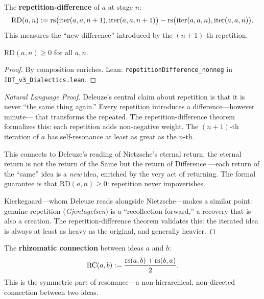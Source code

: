 \begin{definition}
\label{def:repetition-difference}
The \textbf{repetition-difference} of $a$ at stage $n$:
\[
\mathrm{RD}(a, n) := \mathrm{rs}\bigl(\mathrm{iter}(a, a, n+1), \mathrm{iter}(a, a, n+1)\bigr)
- \mathrm{rs}\bigl(\mathrm{iter}(a, a, n), \mathrm{iter}(a, a, n)\bigr).
\]
This measures the ``new difference'' introduced by the $(n+1)$-th repetition.
\end{definition}

\begin{theorem}
\label{thm:rd-nonneg}
$\mathrm{RD}(a, n) \geq 0$ for all $a, n$.
\end{theorem}

\begin{proof}
By composition enriches.
Lean: \texttt{repetitionDifference\_nonneg} in
\texttt{IDT\_v3\_Dialectics.lean}.
\end{proof}

\begin{proof}[Natural Language Proof]
Deleuze's central claim about repetition is that it is never ``the same
thing again.'' Every repetition introduces a difference---however minute---
that transforms the repeated. The repetition-difference theorem formalizes
this: each repetition adds non-negative weight. The $(n+1)$-th iteration
of $a$ has self-resonance at least as great as the $n$-th.

This connects to Deleuze's reading of Nietzsche's eternal return: the
eternal return is not the return of the Same but the return of Difference
---each return of the ``same'' idea is a \emph{new} idea, enriched by the
very act of returning. The formal guarantee is that $\mathrm{RD}(a, n) \geq 0$:
repetition never impoverishes.

Kierkegaard---whom Deleuze reads alongside Nietzsche---makes a similar
point: genuine repetition (\textit{Gjentagelsen}) is a ``recollection
forward,'' a recovery that is also a creation. The repetition-difference
theorem validates this: the iterated idea is always at least as heavy
as the original, and generally heavier.
\end{proof}

\begin{definition}
\label{def:rhizomatic-connection}
The \textbf{rhizomatic connection} between ideas $a$ and $b$:
\[
\mathrm{RC}(a, b) := \frac{\mathrm{rs}(a, b) + \mathrm{rs}(b, a)}{2}.
\]
This is the symmetric part of resonance---a non-hierarchical, non-directed
connection between two ideas.
\end{definition}

